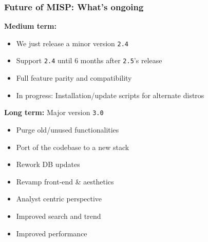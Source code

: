 \begin{frame}
    \frametitle{Future of MISP: What's ongoing}
    \begin{minipage}[t]{0.5\textwidth}
    \textbf{Medium term:}
    \begin{itemize}
        \item We just release a minor version \texttt{2.4}
        \item Support \texttt{2.4} until 6 months after \texttt{2.5}'s release
        \item Full feature parity and compatibility
        \item In progress: Installation/update scripts for alternate distros
    \end{itemize}
    \end{minipage}%
    \begin{minipage}[t]{0.5\textwidth}
    \textbf{Long term:} Major version \texttt{3.0}
    \begin{itemize}
        \item Purge old/unused functionalities
        \item Port of the codebase to a new stack
        \item Rework DB updates
        \item Revamp front-end \& aesthetics
        \item Analyst centric perspective
        \item Improved search and trend 
        \item Improved performance
    \end{itemize}
    \end{minipage}%
\end{frame}

